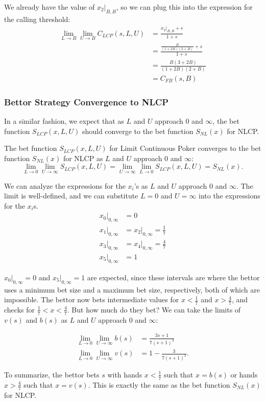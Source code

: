 \documentclass[../../main/main.tex]{subfiles}
\begin{document}
\begin{customproof}
We already have the value of $x_2|_{B,B}$, so we can plug this into the expression for the calling threshold:
\begin{align*}
    \lim_{L \to B} \lim_{U \to B} C_{LCP}(s, L, U) & = \frac{x_2|_{B,B}+s}{1+s} \\
    & = \frac{\frac{B}{(1+2B)(2+B)} + s}{1+s} \\
    & = \frac{B(3+2B)}{(1+2B)(2+B)} \\
    & = C_{FB}(s, B)
\end{align*}
\end{customproof}

\subsubsection{Bettor Strategy Convergence to NLCP}

In a similar fashion, we expect that as $L$ and $U$ approach $0$ and $\infty$, the bet function $S_{LCP}(x, L, U)$ should converge to the bet function $S_{NL}(x)$ for NLCP.

\begin{theorem}
    The bet function $S_{LCP}(x, L, U)$ for Limit Continuous Poker converges to the bet function $S_{NL}(x)$ for NLCP as $L$ and $U$ approach $0$ and $\infty$:
\[
\lim_{L \to 0} \lim_{U \to \infty} S_{LCP}(x, L, U) = \lim_{U \to \infty} \lim_{L \to 0} S_{LCP}(x, L, U) = S_{NL}(x).
\]
\end{theorem}
\begin{customproof}
We can analyze the expressions for the $x_i$'s as $L$ and $U$ approach $0$ and $\infty$. The limit is well-defined, and we can substitute $L=0$ and $U=\infty$ into the expressions for the $x_i$s.
\begin{align*}
    x_0|_{0,\infty} &= 0 \\
    x_1|_{0,\infty} &= x_2|_{0,\infty} = \frac{1}{7} \\
    x_3|_{0,\infty} &= x_4|_{0,\infty} = \frac{4}{7} \\
    x_5|_{0,\infty} &= 1
\end{align*}

$x_0|_{0,\infty} = 0$ and $x_5|_{0,\infty} = 1$ are expected, since these intervals are where the bettor uses a minimum bet size and a maximum bet size, respectively, both of which are impossible. The bettor now bets intermediate values for $x < \frac{1}{7}$ and $x > \frac{4}{7}$, and checks for $\frac{1}{7} < x < \frac{4}{7}$. But how much do they bet? We can take the limits of $v(s)$ and $b(s)$ as $L$ and $U$ approach $0$ and $\infty$:

\begin{align*}
    \lim_{L \to 0} \lim_{U \to \infty} b(s) &= \frac{3 s+1}{7 (s+1)^3}\\
    \lim_{L \to 0} \lim_{U \to \infty} v(s) &= 1 - \frac{3}{7 (s+1)^2}.
\end{align*}

To summarize, the bettor bets $s$ with hands $x < \frac{1}{7}$ such that $x = b(s)$ or hands $x > \frac{4}{7}$ such that $x = v(s)$. This is exactly the same as the bet function $S_{NL}(x)$ for NLCP.

\end{customproof}
\end{document}
